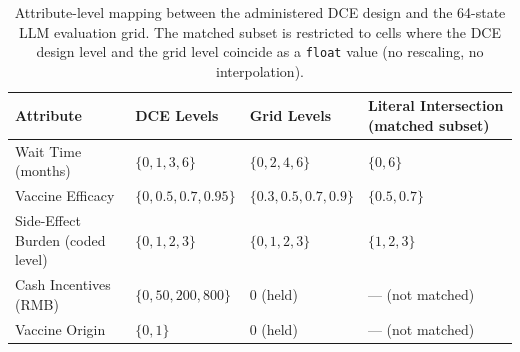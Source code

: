 \documentclass[11pt]{article}
\begin{document}
\begin{table}[h]
\centering
\caption{Attribute-level mapping between the administered DCE design and the 64-state LLM evaluation grid. The matched subset is restricted to cells where the DCE design level and the grid level coincide as a \texttt{float} value (no rescaling, no interpolation).}
\label{tab:S14}
\footnotesize
\setlength{\tabcolsep}{4pt}
\renewcommand{\arraystretch}{1.15}
\begin{tabularx}{\textwidth}{@{}>{\raggedright\arraybackslash}p{2.5cm} >{\raggedright\arraybackslash}p{3.0cm} >{\raggedright\arraybackslash}p{2.8cm} >{\raggedright\arraybackslash}X@{}}
\toprule
\textbf{Attribute} & \textbf{DCE Levels} & \textbf{Grid Levels} & \textbf{Literal Intersection (matched subset)} \\
\midrule
Wait Time (months) & $\{0, 1, 3, 6\}$ & $\{0, 2, 4, 6\}$ & $\{0, 6\}$ \\
Vaccine Efficacy & $\{0, 0.5, 0.7, 0.95\}$ & $\{0.3, 0.5, 0.7, 0.9\}$ & $\{0.5, 0.7\}$ \\
Side-Effect Burden (coded level) & $\{0, 1, 2, 3\}$ & $\{0, 1, 2, 3\}$ & $\{1, 2, 3\}$ \\
Cash Incentives (RMB) & $\{0, 50, 200, 800\}$ & $0$ (held) & --- (not matched) \\
Vaccine Origin & $\{0, 1\}$ & $0$ (held) & --- (not matched) \\
\bottomrule
\end{tabularx}
\end{table}
\end{document}
